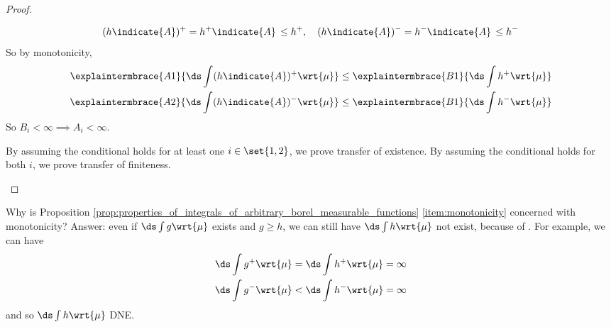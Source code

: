 \documentclass{article} %
\begin{document}
\begin{proof}
\begin{alphabate}
\begin{itemize}
\end{itemize}

\item 
\[ (h \indicate{A})^+ = h^+\indicate{A} \, \leq h^+, \quad  (h \indicate{A})^- = h^- \indicate{A}  \, \leq h^- \]
So by monotonicity,
\begin{align*}
\explaintermbrace{A1}{\ds\int (h \indicate{A})^+ \wrt{\mu}} \leq \explaintermbrace{B1}{\ds\int h^+ \wrt{\mu}} \\
\explaintermbrace{A2}{\ds\int (h \indicate{A})^- \wrt{\mu}} \leq \explaintermbrace{B1}{\ds\int h^- \wrt{\mu}} \\
\end{align*}
So $B_i < \infty \implies A_i < \infty$.

By assuming the conditional holds for at least one $i \in \set{1,2}$, we prove transfer of existence. By assuming the conditional holds for both $i$, we prove transfer of finiteness. 

\end{alphabate}
\end{proof}




\begin{remark}{}
Why is Proposition \ref{prop:properties_of_integrals_of_arbitrary_borel_measurable_functions} \ref{item:monotonicity} concerned with monotonicity? Answer: even if $\ds\int g \wrt{\mu}$ exists and $g \geq h$, we can still have $\ds\int h \wrt{\mu}$ not exist, because of .  For example, we can have 
\begin{align}
\ds\int g^+ \wrt{\mu} &= \ds\int h^+ \wrt{\mu} = \infty  \\
\ds\int g^- \wrt{\mu} & < \ds\int h^- \wrt{\mu} = \infty 	
\end{align}
and so $\ds\int h \wrt{\mu}$ DNE.
\label{rk:why_does_existence_matter_for_monotonicity}
\end{remark}
\end{document}

